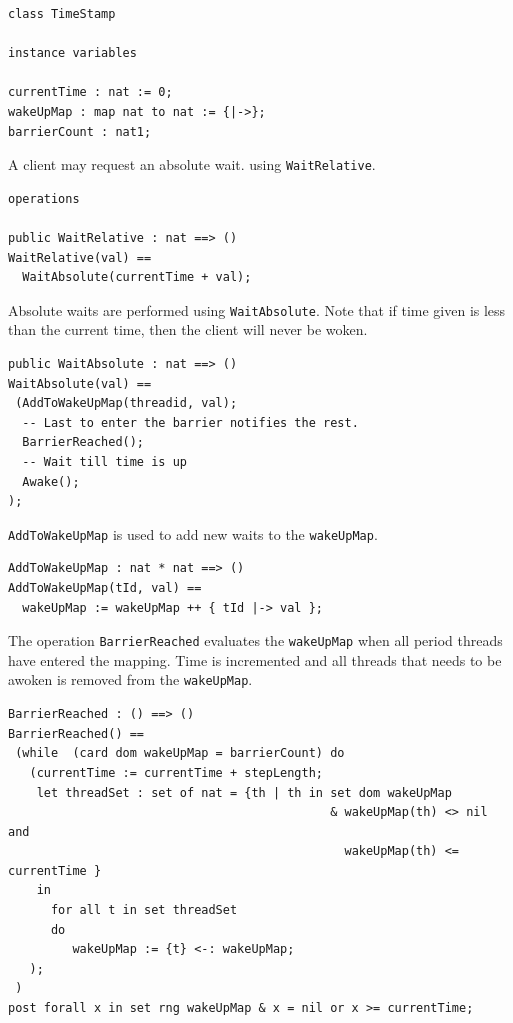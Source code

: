 \documentclass{overturerepchap}
\begin{document}
\begin{lstlisting}
class TimeStamp

instance variables
  
currentTime : nat := 0;
wakeUpMap : map nat to nat := {|->};
barrierCount : nat1;
\end{lstlisting}

A client may request an absolute wait. using \texttt{WaitRelative}.

\begin{lstlisting}
operations

public WaitRelative : nat ==> ()
WaitRelative(val) ==
  WaitAbsolute(currentTime + val);
\end{lstlisting}

Absolute waits are performed using \texttt{WaitAbsolute}. Note that if time
given is less than the current time, then the client will never be
woken.

\begin{lstlisting}
public WaitAbsolute : nat ==> ()
WaitAbsolute(val) ==
 (AddToWakeUpMap(threadid, val);
  -- Last to enter the barrier notifies the rest.
  BarrierReached();
  -- Wait till time is up
  Awake();
);
\end{lstlisting}

\texttt{AddToWakeUpMap} is used to add new waits to the \texttt{wakeUpMap}.

\begin{lstlisting}
AddToWakeUpMap : nat * nat ==> ()
AddToWakeUpMap(tId, val) ==
  wakeUpMap := wakeUpMap ++ { tId |-> val };
\end{lstlisting}

The operation \texttt{BarrierReached} evaluates the \texttt{wakeUpMap} when 
all period threads have entered the mapping. Time is incremented and all threads
that needs to be awoken is removed from the \texttt{wakeUpMap}.

\begin{lstlisting}
BarrierReached : () ==> ()
BarrierReached() == 
 (while  (card dom wakeUpMap = barrierCount) do
   (currentTime := currentTime + stepLength;
    let threadSet : set of nat = {th | th in set dom wakeUpMap 
                                             & wakeUpMap(th) <> nil and 
                                               wakeUpMap(th) <= currentTime }
    in
      for all t in set threadSet 
      do
         wakeUpMap := {t} <-: wakeUpMap;
   );
 )
post forall x in set rng wakeUpMap & x = nil or x >= currentTime;
\end{lstlisting}
\end{document}
